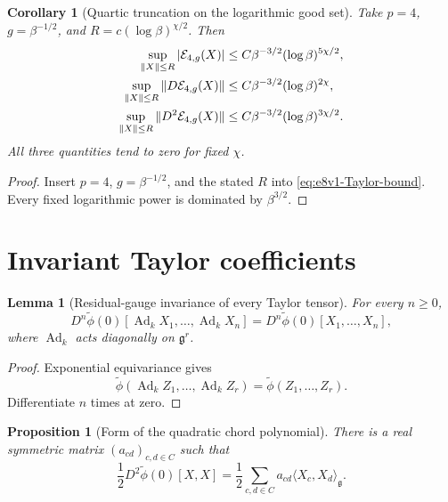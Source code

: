 \documentclass[11pt,oneside]{book}
\newtheorem{lemma}[theorem]{Lemma}
\newtheorem{proposition}[theorem]{Proposition}
\newtheorem{corollary}[theorem]{Corollary}
\theoremstyle{definition}
\theoremstyle{remark}
\begin{document}
\begin{corollary}[Quartic truncation on the logarithmic good set]
\label{cor:e8v1-quartic}
Take \(p=4\), \(g=\beta^{-1/2}\), and
\(R=c(\log\beta)^{\chi/2}\).  Then
\begin{align}
 \sup_{\|X\|\leq R}|{\cal E}_{4,g}(X)|
 &\leq C\beta^{-3/2}(\log\beta)^{5\chi/2},
                                                        \label{eq:e8v1-E0}\\
 \sup_{\|X\|\leq R}\|D{\cal E}_{4,g}(X)\|
 &\leq C\beta^{-3/2}(\log\beta)^{2\chi},
                                                        \label{eq:e8v1-E1}\\
 \sup_{\|X\|\leq R}\|D^2{\cal E}_{4,g}(X)\|
 &\leq C\beta^{-3/2}(\log\beta)^{3\chi/2}.
                                                        \label{eq:e8v1-E2}
\end{align}
All three quantities tend to zero for fixed \(\chi\).
\end{corollary}

\begin{proof}
Insert \(p=4\), \(g=\beta^{-1/2}\), and the stated \(R\) into
\eqref{eq:e8v1-Taylor-bound}.  Every fixed logarithmic power is
dominated by \(\beta^{3/2}\).
\end{proof}

\section{Invariant Taylor coefficients}
\label{sec:e8v1-invariants}

\begin{lemma}[Residual-gauge invariance of every Taylor tensor]
\label{lem:e8v1-tensors}
For every \(n\geq0\),
\[
 D^n\widetilde\phi(0)
 [\operatorname{Ad}_kX_1,\ldots,\operatorname{Ad}_kX_n]
 =
 D^n\widetilde\phi(0)[X_1,\ldots,X_n],               \label{eq:e8v1-tensor-invariance}
\]
where \(\operatorname{Ad}_k\) acts diagonally on
\(\mathfrak g^r\).
\end{lemma}

\begin{proof}
Exponential equivariance gives
\[
 \widetilde\phi(\operatorname{Ad}_kZ_1,\ldots,
 \operatorname{Ad}_kZ_r)=\widetilde\phi(Z_1,\ldots,Z_r).
\]
Differentiate \(n\) times at zero.
\end{proof}

\begin{proposition}[Form of the quadratic chord polynomial]
\label{prop:e8v1-quadratic}
There is a real symmetric matrix
\((a_{cd})_{c,d\in C}\) such that
\[
 \frac12D^2\widetilde\phi(0)[X,X]
 =
 \frac12\sum_{c,d\in C}
 a_{cd}\langle X_c,X_d\rangle_{\mathfrak g}.         \label{eq:e8v1-quadratic}
\]
\end{proposition}
\end{document}
